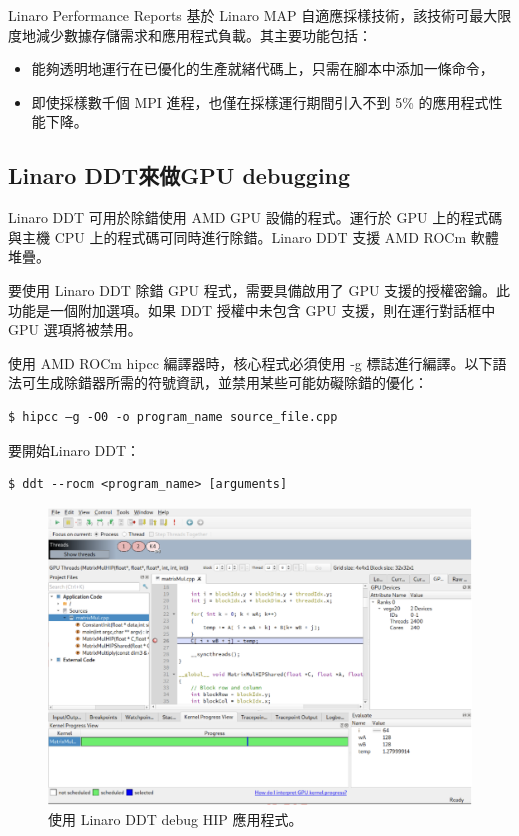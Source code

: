 Linaro Performance Reports 基於 Linaro MAP 自適應採樣技術，該技術可最大限度地減少數據存儲需求和應用程式負載。其主要功能包括：

\begin{itemize}
    \item 能夠透明地運行在已優化的生產就緒代碼上，只需在腳本中添加一條命令，
    \item 即使採樣數千個 MPI 進程，也僅在採樣運行期間引入不到 5\% 的應用程式性能下降。
\end{itemize}


\subsection{Linaro DDT來做GPU debugging}

Linaro DDT 可用於除錯使用 AMD GPU 設備的程式。運行於 GPU 上的程式碼與主機 CPU 上的程式碼可同時進行除錯。Linaro DDT 支援 AMD ROCm 軟體堆疊。

要使用 Linaro DDT 除錯 GPU 程式，需要具備啟用了 GPU 支援的授權密鑰。此功能是一個附加選項。如果 DDT 授權中未包含 GPU 支援，則在運行對話框中 GPU 選項將被禁用。

使用 AMD ROCm hipcc 編譯器時，核心程式必須使用 -g 標誌進行編譯。以下語法可生成除錯器所需的符號資訊，並禁用某些可能妨礙除錯的優化：

\begin{lstlisting}
$ hipcc –g -O0 -o program_name source_file.cpp
\end{lstlisting}

要開始Linaro DDT：
\begin{lstlisting}
$ ddt --rocm <program_name> [arguments]
\end{lstlisting}

\begin{figure}
    \centering
    \includegraphics[width=0.9\linewidth]{FileAusiliari/Screenshots/Figure13-30.png}
    \caption{使用 Linaro DDT debug HIP 應用程式。}
    \label{fig:PAPI30}
\end{figure}

